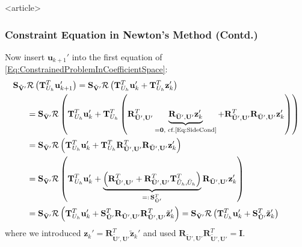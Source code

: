 \begin{frame}<article>
\frametitle<presentation>{Constraint Equation in Newton's Method (Contd.)}
Now insert  $\mathbf{u}_{k+1}'$ into the first equation of
\eqref{Eq:ConstrainedProblemInCoefficientSpace}:
\begin{equation}
\begin{split}
\mathbf{S}_{\tilde{\mathbf{V}}'}
&\mathcal{R}\left(\mathbf{T}^T_{U_h}\mathbf{u}_{k+1}'\right)
= \mathbf{S}_{\tilde{\mathbf{V}}'}
\mathcal{R}\left(\mathbf{T}^T_{U_h}\mathbf{u}_{k}' +
\mathbf{T}^T_{U_h}\mathbf{z}_{k}' \right)\\
&= \mathbf{S}_{\tilde{\mathbf{V}}'}
\mathcal{R}\left(\mathbf{T}^T_{U_h}\mathbf{u}_{k}' +
\mathbf{T}^T_{U_h} \left(\mathbf{R}^T_{\bar{\mathbf{U}}',\mathbf{U}'}
\underbrace{\mathbf{R}_{\bar{\mathbf{U}}',\mathbf{U}'}
  \mathbf{z}_{k}'}_{=\mathbf{0}, \text{ cf.\eqref{Eq:SideCond}}} +
\mathbf{R}^T_{\tilde{\mathbf{U}}',\mathbf{U}'} 
\mathbf{R}_{\tilde{\mathbf{U}}',\mathbf{U}'} \mathbf{z}_{k}' \right)
\right)\\
&= \mathbf{S}_{\tilde{\mathbf{V}}'}
\mathcal{R}\left(\mathbf{T}^T_{U_h}\mathbf{u}_{k}' +
\mathbf{T}^T_{U_h} \mathbf{R}^T_{\tilde{\mathbf{U}}',\mathbf{U}'} 
\mathbf{R}_{\tilde{\mathbf{U}}',\mathbf{U}'} \mathbf{z}_{k}' \right)\\
&= \mathbf{S}_{\tilde{\mathbf{V}}'}
\mathcal{R}\left(\mathbf{T}^T_{U_h}\mathbf{u}_{k}' +
\underbrace{\left(\mathbf{R}^T_{\tilde{\mathbf{U}}',\mathbf{U}'} +
\mathbf{R}^T_{\bar{\mathbf{U}}',\mathbf{U}'} \mathbf{T}^T_{\tilde{U}_h,\bar{U}_h}
\right)}_{=: \,\mathbf{S}^T_{\tilde{\mathbf{U}}'}}
\mathbf{R}_{\tilde{\mathbf{U}}',\mathbf{U}'} \mathbf{z}_{k}' 
\right) \\
&= 
\mathbf{S}_{\tilde{\mathbf{V}}'}
\mathcal{R}\left(\mathbf{T}^T_{U_h}\mathbf{u}_{k}' + 
\mathbf{S}^T_{\tilde{\mathbf{U}}'}
\mathbf{R}_{\tilde{\mathbf{U}}',\mathbf{U}'}
\mathbf{R}^T_{\tilde{\mathbf{U}}',\mathbf{U}'} \tilde{\mathbf{z}}_{k}'
\right)
=
\mathbf{S}_{\tilde{\mathbf{V}}'}
\mathcal{R}\left(\mathbf{T}^T_{U_h}\mathbf{u}_{k}' + 
\mathbf{S}^T_{\tilde{\mathbf{U}}'} \tilde{\mathbf{z}}_{k}'\right)
\end{split}
\end{equation}
where we introduced $\mathbf{z}_{k}' =
\mathbf{R}^T_{\tilde{\mathbf{U}}',\mathbf{U}'}
\tilde{\mathbf{z}}_{k}'$ and used $\mathbf{R}_{\tilde{\mathbf{U}}',\mathbf{U}'}
\mathbf{R}^T_{\tilde{\mathbf{U}}',\mathbf{U}'}=\mathbf{I}$. 
\end{frame}


